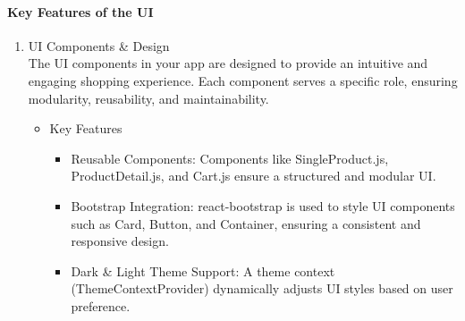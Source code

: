 \documentclass{llncs}
\begin{document}
\paragraph{Key Features of the UI}
    \begin{enumerate}
        \item UI Components \& Design \\
        The UI components in your app are designed to provide an intuitive and engaging shopping experience. Each component serves a specific role, ensuring modularity, reusability, and maintainability.
        \begin{itemize}
            \item Key Features 
            \begin{itemize}
                \item Reusable Components: Components like SingleProduct.js, ProductDetail.js, and Cart.js ensure a structured and modular UI. 
                \item Bootstrap Integration: react-bootstrap is used to style UI components such as Card, Button, and Container, ensuring a consistent and responsive design.
                \item Dark \& Light Theme Support: A theme context (ThemeContextProvider) dynamically adjusts UI styles based on user preference.\\
            \end{itemize}
        \end{itemize}


\end{enumerate}
\end{document}
